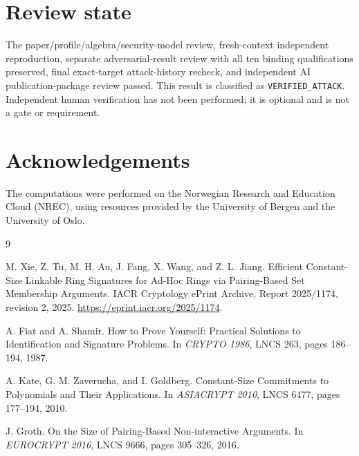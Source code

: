 \documentclass[10pt,a4paper]{article}
\begin{document}
\section{Review state}

The paper/profile/algebra/security-model review, fresh-context independent
reproduction, separate adversarial-result review with all ten binding
qualifications preserved, final exact-target attack-history recheck, and
independent AI publication-package review passed. This result is classified
as \texttt{VERIFIED\_ATTACK}. Independent human verification has not been
performed; it is optional and is not a gate or requirement.

\section*{Acknowledgements}
The computations were performed on the Norwegian Research and Education Cloud (NREC), using resources provided by the University of Bergen and the University of Oslo.

\begin{thebibliography}{9}

M. Xie, Z. Tu, M. H. Au, J. Fang, X. Wang, and Z. L. Jiang.
\newblock Efficient Constant-Size Linkable Ring Signatures for Ad-Hoc Rings
via Pairing-Based Set Membership Arguments.
\newblock IACR Cryptology ePrint Archive, Report 2025/1174, revision 2, 2025.
\newblock \url{https://eprint.iacr.org/2025/1174}.

A. Fiat and A. Shamir.
\newblock How to Prove Yourself: Practical Solutions to Identification and
Signature Problems.
\newblock In \emph{CRYPTO 1986}, LNCS 263, pages 186--194, 1987.

A. Kate, G. M. Zaverucha, and I. Goldberg.
\newblock Constant-Size Commitments to Polynomials and Their Applications.
\newblock In \emph{ASIACRYPT 2010}, LNCS 6477, pages 177--194, 2010.

J. Groth.
\newblock On the Size of Pairing-Based Non-interactive Arguments.
\newblock In \emph{EUROCRYPT 2016}, LNCS 9666, pages 305--326, 2016.

\end{thebibliography}
\end{document}

